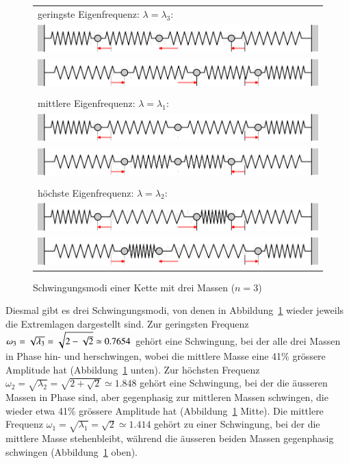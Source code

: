 \begin{figure}
\begin{center}
\begin{tabular}{l}
geringste Eigenfrequenz: $\lambda=\lambda_3$:\\
\includegraphics[width=\hsize]{images/e-8}\\
\includegraphics[width=\hsize]{images/e-9}\\
\\
mittlere Eigenfrequenz: $\lambda=\lambda_1$:\\
\includegraphics[width=\hsize]{images/e-6}\\
\includegraphics[width=\hsize]{images/e-7}\\
\\
höchste Eigenfrequenz: $\lambda=\lambda_2$:\\
\includegraphics[width=\hsize]{images/e-10}\\
\includegraphics[width=\hsize]{images/e-11}
\end{tabular}
\end{center}
\caption{Schwingungsmodi einer Kette mit drei Massen ($n=3$)\label{n3modi}}
\end{figure}%
Diesmal gibt es drei Schwingungsmodi, von denen in Abbildung~\ref{n3modi}
wieder jeweils die Extremlagen dargestellt sind.
Zur geringsten Frequenz
$\omega_3=\sqrt{\mathstrut\lambda_3}=\sqrt{2-\sqrt{2\mathstrut}}\simeq 0.7654$
gehört eine Schwingung, bei der alle drei Massen in Phase
hin- und herschwingen, wobei die mittlere Masse eine 41\%
grössere Amplitude hat (Abbildung~\ref{n3modi} unten).
Zur höchsten Frequenz
$\omega_2=\sqrt{\lambda_2}=\sqrt{2+\sqrt{2}}\simeq 1.848$
gehört eine Schwingung, bei der die äusseren Massen in Phase sind,
aber gegenphasig zur mittleren Massen schwingen, die wieder etwa
41\% grössere Amplitude hat (Abbildung~\ref{n3modi} Mitte).
Die mittlere Frequenz $\omega_1=\sqrt{\lambda_1}=\sqrt{2}\simeq 1.414$
gehört zu einer Schwingung, bei der die mittlere Masse stehenbleibt,
während die äusseren beiden Massen gegenphasig schwingen (Abbildung~\ref{n3modi} oben).

